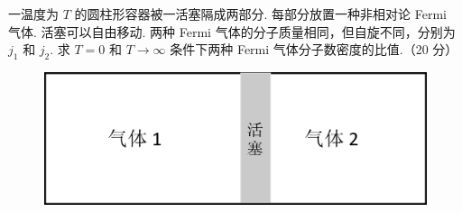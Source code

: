 \documentclass{assignment}
\begin{document}
\begin{sol}
\begin{itemize}
    \end{itemize}
\end{sol}
\clearpage

\begin{prob}
    一温度为 $T$ 的圆柱形容器被一活塞隔成两部分. 每部分放置一种非相对论 Fermi 气体. 活塞可以自由移动. 两种 Fermi 气体的分子质量相同，但自旋不同，分别为 $j_1$ 和 $j_2$. 求 $T=0$ 和 $T\rightarrow\infty$ 条件下两种 Fermi 气体分子数密度的比值.（20 分）
    \begin{figure}[h]
        \centering
        \includegraphics[width=.5\columnwidth]{P2.png}
    \end{figure}
\end{prob}
\begin{sol}
    
\end{sol}
\clearpage
\end{document}
